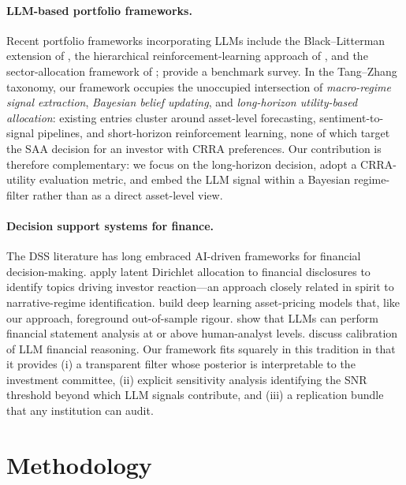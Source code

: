 \documentclass[review,12pt,authoryear]{elsarticle}
\begin{document}
\paragraph{LLM-based portfolio frameworks.}
Recent portfolio frameworks incorporating LLMs include the Black--Litterman extension of
\citet{Chen2024LLMBL}, the hierarchical reinforcement-learning approach of
\citet{KimEtAl2025HARLF}, and the sector-allocation framework of
\citet{Wang2025SectorAllocation}; \citet{TangZhang2024LLMInvesting} provide a benchmark
survey. In the Tang--Zhang taxonomy, our framework occupies the unoccupied intersection
of \emph{macro-regime signal extraction}, \emph{Bayesian belief updating}, and
\emph{long-horizon utility-based allocation}: existing entries cluster around asset-level
forecasting, sentiment-to-signal pipelines, and short-horizon reinforcement learning,
none of which target the SAA decision for an investor with CRRA preferences. Our
contribution is therefore complementary: we focus on the long-horizon decision, adopt a
CRRA-utility evaluation metric, and embed the LLM signal within a Bayesian regime-filter
rather than as a direct asset-level view.

\paragraph{Decision support systems for finance.}
The DSS literature has long embraced AI-driven frameworks for financial decision-making.
\citet{FeuerriegelProllochs2020DSS} apply latent Dirichlet allocation to financial
disclosures to identify topics driving investor reaction---an approach closely related in
spirit to narrative-regime identification. \citet{ChenPelgerZhu2024} build deep
learning asset-pricing models that, like our approach, foreground out-of-sample rigour.
\citet{KimMuhnNikolaev2024} show that LLMs can perform financial statement analysis at or
above human-analyst levels. \citet{Fatouros2024EvaluatingFinLLMs} discuss calibration of
LLM financial reasoning. Our framework fits squarely in this tradition in that it provides
(i) a transparent filter whose posterior is interpretable to the investment committee,
(ii) explicit sensitivity analysis identifying the SNR threshold beyond which LLM signals
contribute, and (iii) a replication bundle that any institution can audit.

\section{Methodology}
\label{sec:method}
\end{document}
